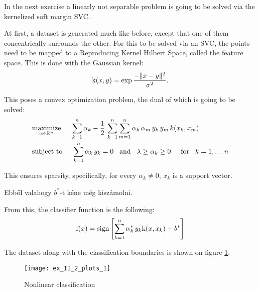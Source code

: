 In the next exercise a linearly not separable problem is going to be solved
via the kernelized soft margin SVC.

At first, a dataset is generated much like before, except that one of them concentrically
surrounds the other. For this to be solved via an SVC, the points need to be mapped
to a Reproducing Kernel Hilbert Space, called the feature space.
This is done with the Gaussian kernel:
\begin{equation}
	\mathrm{k}(x, y) = \exp\frac{-\lVert x-y\rVert^2}{\sigma^2}.
\end{equation}

This poses a convex optimization problem, the dual of which is going to be solved:
\begin{equation}
\begin{split}
	&\underset{\alpha\in\mathbb{R}^n}{\operatorname{maximize}}\hspace{5mm}
		\sum\limits_{k=1}^n\alpha_k - \frac{1}{2}\,\sum\limits_{k=1}^n\sum\limits_{m=1}^n\alpha_k\,\alpha_m\,y_k\,y_m\,k(x_k, x_m)\\
	&\text{subject to}\hspace{5mm}
		\sum\limits_{k=1}^n\alpha_k\,y_k=0\hspace{3mm}\text{and}\hspace{3mm}\lambda\geq\alpha_k\geq0\hspace{5mm}\text{for}\hspace{3mm} k=1,\dots n
\end{split}
\end{equation}

This ensures sparsity, specifically, for every $\alpha_k\neq0$, $x_k$ is a support vector.

Ebből valahogy $b^*$-t kéne még kiszámolni.

From this, the classifier function is the following:
\begin{equation}
	\mathrm{f}(x) = \operatorname{sign}\left[\sum\limits_{k=1}^n\alpha_k^*\,y_k\mathrm{k}(x, x_k) + b^*\right]
\end{equation}

The dataset along with the classification boundaries is shown on figure \ref{fig:kernel-SVC}.

\begin{figure}[H]
	\centering
	\texttt{[image: ex\_II\_2\_plots\_1]}
	\caption{Nonlinear classification}
	\label{fig:kernel-SVC}
\end{figure}

